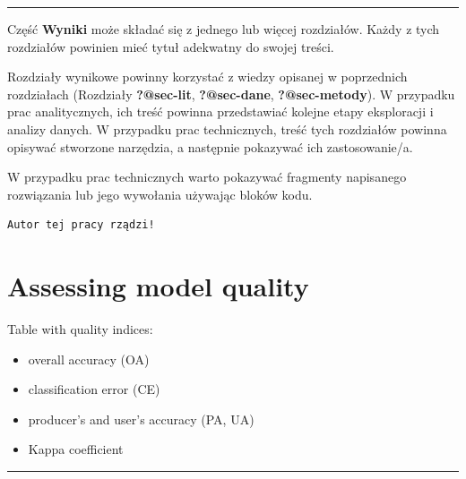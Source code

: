\documentclass{amuthesis}
\begin{document}
\begin{center}\rule{0.5\linewidth}{0.5pt}\end{center}

Część \textbf{Wyniki} może składać się z jednego lub więcej rozdziałów.
Każdy z tych rozdziałów powinien mieć tytuł adekwatny do swojej treści.

Rozdziały wynikowe powinny korzystać z wiedzy opisanej w poprzednich
rozdziałach (Rozdziały \textbf{?@sec-lit}, \textbf{?@sec-dane},
\textbf{?@sec-metody}). W przypadku prac analitycznych, ich treść
powinna przedstawiać kolejne etapy eksploracji i analizy danych. W
przypadku prac technicznych, treść tych rozdziałów powinna opisywać
stworzone narzędzia, a następnie pokazywać ich zastosowanie/a.

W przypadku prac technicznych warto pokazywać fragmenty napisanego
rozwiązania lub jego wywołania używając bloków kodu.

\begin{Shaded}
\begin{Highlighting}[]
\OtherTok{=} 
  \NormalTok{)}
\NormalTok{\}}
\NormalTok{(}\NormalTok{)}
\end{Highlighting}
\end{Shaded}

\begin{verbatim}
Autor tej pracy rządzi!
\end{verbatim}


\hypertarget{sec-results-eval}{%
\chapter{Assessing model quality}\label{sec-results-eval}}

Table with quality indices:

\begin{itemize}
\item
  overall accuracy (OA)
\item
  classification error (CE)
\item
  producer's and user's accuracy (PA, UA)
\item
  Kappa coefficient
\end{itemize}

\begin{center}\rule{0.5\linewidth}{0.5pt}\end{center}
\end{document}
